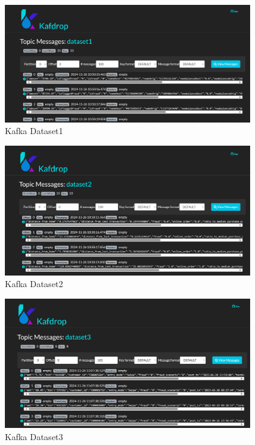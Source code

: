 \documentclass[12pt,a4paper, hidelinks]{article}
\begin{document}
\begin{figure}[h!]
  \centering
  \includegraphics[width=0.95\textwidth]{images/m2-kafka-1.png}
  \caption{Kafka Dataset1}
  \label{fig:kafka1}
\end{figure}

\begin{figure}[h!]
  \centering
  \includegraphics[width=0.95\textwidth]{images/m2-kafka-2.png}
  \caption{Kafka Dataset2}
  \label{fig:kafka2}
\end{figure}

\begin{figure}[h!]
  \centering
  \includegraphics[width=0.95\textwidth]{images/m2-kafka-3.png}
  \caption{Kafka Dataset3}
  \label{fig:kafka3}
\end{figure}
\end{document}
